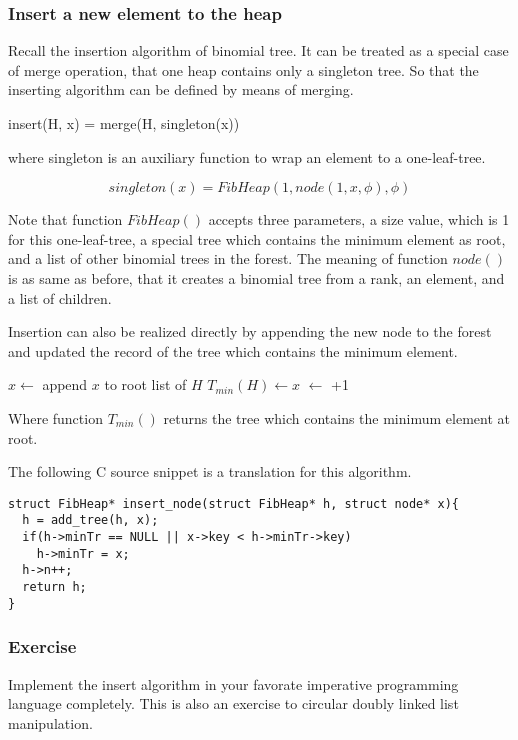\documentclass{article}
\begin{document}
\subsubsection{Insert a new element to the heap}
Recall the insertion algorithm of binomial  tree. It can be treated
as a special case of merge operation, that one heap contains only
a singleton tree. So that the inserting algorithm can be defined
by means of merging.

\be
insert(H, x) = merge(H, singleton(x))
\label{eq:fib-insert}
\ee

where singleton is an auxiliary function to wrap an element to a
one-leaf-tree.

\[
singleton(x) = FibHeap(1, node(1, x, \phi), \phi)
\]

Note that function $FibHeap()$ accepts three parameters, a
size value, which is 1 for this one-leaf-tree, a special tree
which contains the minimum element as root, and a list of other
binomial trees in the forest. The meaning of function $node()$ is
as same as before, that it creates a binomial tree from a rank,
an element, and a list of children.

Insertion can also be realized directly by appending the new node
to the forest and updated the record of the tree which contains the
minimum element.

\begin{algorithmic}
  \State $x \gets$  
  \State append $x$ to root list of $H$
    \State $T_{min}(H) \gets x$
  \EndIf
  \State {} $\gets$ +1
\EndFunction
\end{algorithmic}

Where function $T_{min}()$ returns the tree which contains the minimum 
element at root.

The following C source snippet is a translation for this algorithm.

\lstset{language=C}
\begin{lstlisting}
struct FibHeap* insert_node(struct FibHeap* h, struct node* x){
  h = add_tree(h, x);
  if(h->minTr == NULL || x->key < h->minTr->key)
    h->minTr = x;
  h->n++;
  return h;
}
\end{lstlisting}

\subsubsection*{Exercise}
Implement the insert algorithm in your favorate imperative programming
language completely. This is also an exercise to circular doubly linked list
manipulation.
\end{document}
